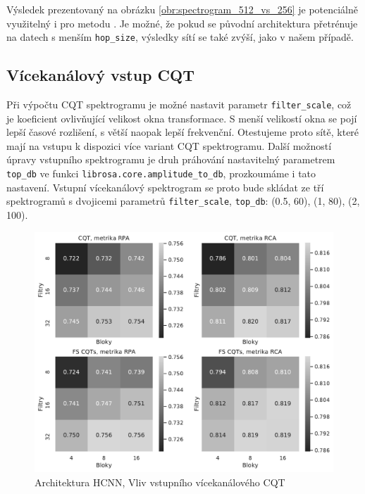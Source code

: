 Výsledek prezentovaný na obrázku \ref{obr:spectrogram_512_vs_256} je potenciálně využitelný i pro metodu \cite{Bittner2017}. Je možné, že pokud se původní architektura přetrénuje na datech s menším \texttt{hop\_size}, výsledky sítí se také zvýší, jako v našem případě.

\subsection{Vícekanálový vstup CQT}\label{exp:hcnn_multichannel}

Při výpočtu CQT spektrogramu je možné nastavit parametr \texttt{filter\_scale}, což je koeficient ovlivňující velikost okna transformace. S menší velikostí okna se pojí lepší časové rozlišení, s větší naopak lepší frekvenční. Otestujeme proto sítě, které mají na vstupu k dispozici více variant CQT spektrogramu. Další možností úpravy vstupního spektrogramu je druh práhování nastavitelný parametrem \texttt{top\_db} ve funkci \texttt{librosa.core.amplitude\_to\_db}, prozkoumáme i tato nastavení. Vstupní vícekanálový spektrogram se proto bude skládat ze tří spektrogramů s dvojicemi parametrů \texttt{filter\_scale}, \texttt{top\_db}: (0.5, 60), (1, 80), (2, 100).

\begin{figure}[h]\centering
    \includegraphics[scale=0.55]{../img/figures/spectrogram_fscqt_grey}
\caption{Architektura HCNN, Vliv vstupního vícekanálového CQT}\label{obr:spectrogram_fscqt}
\end{figure}

